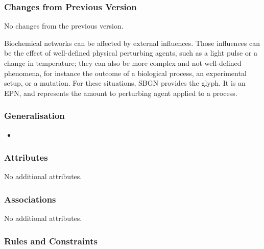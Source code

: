 \subsubsection{Changes from Previous Version}

No changes from the previous version.

\label{sec:techref:perturbing agent}

Biochemical networks can be affected by external influences.  Those
influences can be the effect of well-defined physical perturbing
agents, such as a light pulse or a change in temperature; they can
also be more complex and not well-defined phenomena, for instance the
outcome of a biological process, an experimental setup, or a mutation.
For these situations, SBGN provides the 
glyph. It is an EPN, and represents the amount to perturbing agent
applied to a process.

\subsubsection{Generalisation}

\begin{itemize}
\item {}
\end{itemize}

\subsubsection{Attributes}

No additional attributes.

\subsubsection{Associations}

No additional attributes.

\subsubsection{Rules and Constraints}

\begin{valrules}
\end{valrules}


